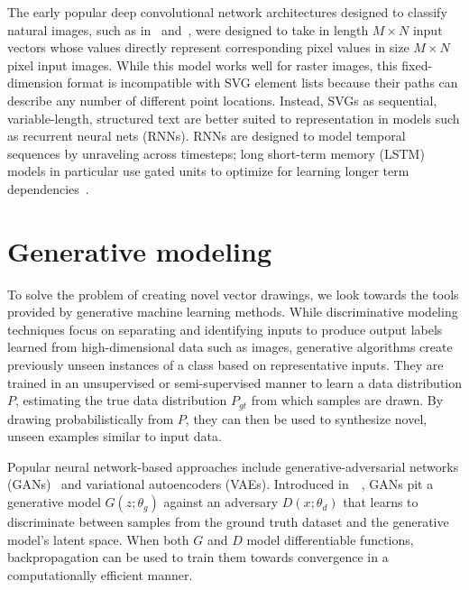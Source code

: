 The early popular deep convolutional network architectures designed to classify natural images, such as in~\cite{krizhevsky2012imagenet} and~\cite{simonyan2014very}, were designed to take in length $M\times N$ input vectors whose values directly represent corresponding pixel values in size $M\times N$ pixel input images.
While this model works well for raster images, this fixed-dimension format is incompatible with SVG element lists because their paths can describe any number of different point locations.
Instead, SVGs as sequential, variable-length, structured text are better suited to representation in models such as recurrent neural nets (RNNs).
RNNs are designed to model temporal sequences by unraveling across timesteps; long short-term memory (LSTM) models in particular use gated units to optimize for learning longer term dependencies~\cite{hochreiter1997long}.

\section{Generative modeling}
To solve the problem of creating novel vector drawings, we look towards the tools provided by generative machine learning methods.
While discriminative modeling techniques focus on separating and identifying inputs to produce output labels learned from high-dimensional data such as images, generative algorithms create previously unseen instances of a class based on representative inputs.
They are trained in an unsupervised or semi-supervised manner to learn a data distribution $P$, estimating the true data distribution $P_{gt}$ from which samples are drawn.
By drawing probabilistically from $P$, they can then be used to synthesize novel, unseen examples similar to input data.

Popular neural network-based approaches include generative-adversarial networks (GANs)~\cite{karpathy2016generative} and variational autoencoders (VAEs).
Introduced in~\citeyear{goodfellow2014generative}~\cite{goodfellow2014generative}, GANs pit a generative model $G(z; \theta_g)$ against an adversary $D(x; \theta_d)$ that learns to discriminate between samples from the ground truth dataset and the generative model's latent space.
When both $G$ and $D$ model differentiable functions, backpropagation can be used to train them towards convergence in a computationally efficient manner.

